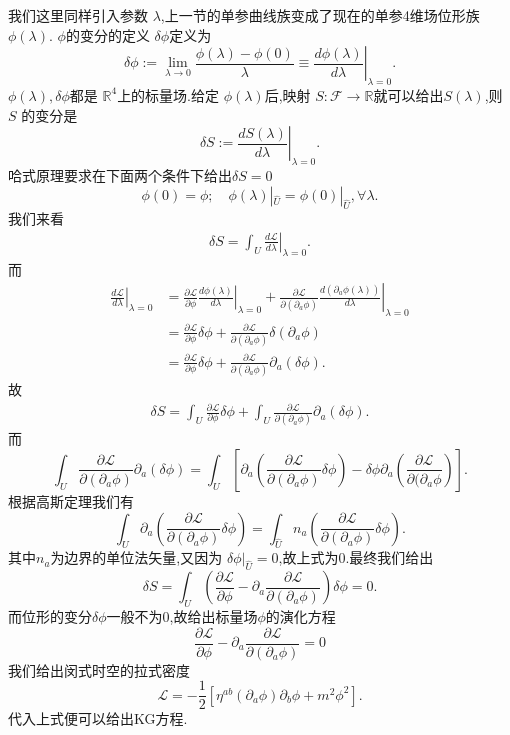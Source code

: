 \documentclass[../main.tex]{subfiles}
\begin{document}
我们这里同样引入参数 $\lambda$,上一节的单参曲线族变成了现在的单参4维场位形族 $\phi(\lambda)$.
 $\phi$的变分的定义 $\delta \phi$定义为 \[
   \delta \phi := \lim_{\lambda\to 0}\frac{\phi(\lambda)- \phi(0)}{\lambda} \equiv \left.\frac{d\phi(\lambda)}{d \lambda}\right|_{\lambda = 0} 
 .\] 
 $\phi(\lambda),\delta \phi$都是 $\mathbb{R}^4$上的标量场.给定 $\phi(\lambda)$后,映射 $S: \mathscr{F}\to \mathbb{R}$就可以给出$S(\lambda)$,则 $S$
 的变分是 \[
 \delta S := \left.\frac{d S(\lambda)}{d \lambda}\right|_{\lambda = 0} 
.\] 
哈式原理要求在下面两个条件下给出$\delta S =0$\[
  \phi(0) = \phi;\quad \phi(\lambda)|_{\hat{U}} = \phi(0)|_{\hat{U}},\forall\lambda 
.\] 
我们来看
\begin{align*}
  \delta S = \int_{U} \left.\frac{d \mathscr{L}}{d \lambda}\right|_{\lambda = 0} 
.\end{align*}
而
\begin{align*}
  \left.\frac{d \mathscr{L}}{d \lambda}\right|_{\lambda = 0}  &= \frac{\partial \mathscr{L}}{\partial \phi} \left.\frac{d \phi(\lambda)}{d\lambda}\right|_{\lambda=0} + \frac{\partial \mathscr{L}}{\partial (\partial_a \phi)} \left.\frac{d(\partial_a\phi(\lambda))}{d\lambda}\right|_{\lambda = 0}   \\
                                                              & = \frac{\partial \mathscr{L}}{\partial \phi}\delta \phi + \frac{\partial \mathscr{L}}{\partial (\partial_a \phi)}\delta(\partial_a\phi)\\
                                                              & = \frac{\partial \mathscr{L}}{\partial \phi}\delta \phi + \frac{\partial \mathscr{L}}{\partial (\partial_a \phi)}\partial_a(\delta\phi)
.\end{align*}
故
\begin{align*}
 \delta S = \int_U \frac{\partial \mathscr{L}}{\partial \phi}\delta \phi + \int_U\frac{\partial \mathscr{L}}{\partial (\partial_a \phi)}\partial_a(\delta\phi)
.\end{align*}
而\[
  \int_U\frac{\partial \mathscr{L}}{\partial (\partial_a \phi)}\partial_a(\delta\phi) = \int_U\left[\partial_a\left(\frac{\partial \mathscr{L}}{\partial (\partial_a \phi)}\delta\phi\right) - \delta \phi \partial_a \left( \frac{\partial \mathscr{L}}{\partial (\partial_a\phi}  \right)  \right]
.\] 
根据高斯定理我们有\[
  \int_U\partial_a\left(\frac{\partial \mathscr{L}}{\partial (\partial_a \phi)}\delta\phi\right) = \int_{\hat{U}}n_a\left(\frac{\partial \mathscr{L}}{\partial (\partial_a \phi)}\delta\phi\right)
.\] 
其中$n_a$为边界的单位法矢量,又因为 $\delta \phi|_{\hat{U}} = 0$,故上式为0.最终我们给出\[
\delta S = \int_U \left( \frac{\partial \mathscr{L}}{\partial \phi} - \partial_a\frac{\partial \mathscr{L}}{\partial (\partial_a \phi)}   \right) \delta\phi = 0
.\] 
而位形的变分$\delta \phi$一般不为0,故给出标量场$\phi$的演化方程 
\begin{equation}
  \frac{\partial \mathscr{L}}{\partial \phi} - \partial_a\frac{\partial \mathscr{L}}{\partial (\partial_a \phi)} = 0
  \label{eq:15-1-3}
\end{equation}
我们给出闵式时空的拉式密度\[
  \mathscr{L} = - \frac{1}{2}[\eta^{ab}(\partial_a\phi)\partial_b\phi +m^2\phi^2]
.\] 
代入上式便可以给出KG方程.
\end{document}
